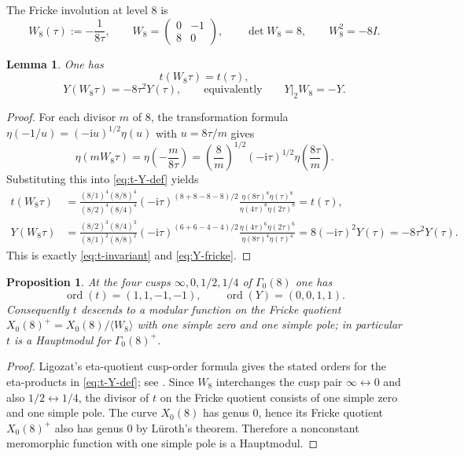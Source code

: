 \documentclass[11pt]{amsart}
\numberwithin{equation}{section}
\theoremstyle{plain}
\newtheorem{proposition}[theorem]{Proposition}
\newtheorem{lemma}[theorem]{Lemma}
\theoremstyle{definition}
\theoremstyle{remark}
\newcommand{\ii}{\mathrm{i}}
\newcommand{\etaf}{\eta}
\DeclareMathOperator{\ord}{ord}
\begin{document}
The Fricke involution at level $8$ is
\begin{equation}\label{eq:W8-def}
W_8(\tau):=-\frac{1}{8\tau},
\qquad
W_8=\begin{pmatrix}0&-1\\ 8&0\end{pmatrix},
\qquad
\det W_8=8,
\qquad
W_8^2=-8I.
\end{equation}

\begin{lemma}\label{lem:t-Y-transform}
One has
\begin{equation}\label{eq:t-invariant}
t(W_8\tau)=t(\tau),
\end{equation}
\begin{equation}\label{eq:Y-fricke}
Y(W_8\tau)=-8\tau^2Y(\tau),
\qquad\text{equivalently}\qquad
Y|_2W_8=-Y.
\end{equation}
\end{lemma}

\begin{proof}
For each divisor $m$ of $8$, the transformation formula $\eta(-1/u)=(-\ii u)^{1/2}\eta(u)$ with $u=8\tau/m$ gives
\[
\etaf(mW_8\tau)=\etaf\!\left(-\frac{m}{8\tau}\right)=\left(\frac{8}{m}\right)^{1/2}(-\ii\tau)^{1/2}\etaf\!\left(\frac{8\tau}{m}\right).
\]
Substituting this into \eqref{eq:t-Y-def} yields
\begin{align*}
t(W_8\tau)
&=\frac{(8/1)^4(8/8)^4}{(8/2)^4(8/4)^4}
(-\ii\tau)^{(8+8-8-8)/2}
\frac{\eta(8\tau)^8\eta(\tau)^8}{\eta(4\tau)^8\eta(2\tau)^8}
=t(\tau),\\
Y(W_8\tau)
&=\frac{(8/2)^3(8/4)^3}{(8/1)^2(8/8)^2}
(-\ii\tau)^{(6+6-4-4)/2}
\frac{\eta(4\tau)^6\eta(2\tau)^6}{\eta(8\tau)^4\eta(\tau)^4}
=8(-\ii\tau)^2Y(\tau)=-8\tau^2Y(\tau).
\end{align*}
This is exactly \eqref{eq:t-invariant} and \eqref{eq:Y-fricke}.
\end{proof}

\begin{proposition}\label{prop:hauptmodul}
At the four cusps $\infty,0,1/2,1/4$ of $\Gamma_0(8)$ one has
\[
\ord(t)=(1,1,-1,-1),
\qquad
\ord(Y)=(0,0,1,1).
\]
Consequently $t$ descends to a modular function on the Fricke quotient $X_0(8)^+=X_0(8)/\langle W_8\rangle$ with one simple zero and one simple pole; in particular $t$ is a Hauptmodul for $\Gamma_0(8)^+$.
\end{proposition}

\begin{proof}
Ligozat's eta-quotient cusp-order formula gives the stated orders for the eta-products in \eqref{eq:t-Y-def}; see \cite{Ligozat}. Since $W_8$ interchanges the cusp pair $\infty\leftrightarrow 0$ and also $1/2\leftrightarrow 1/4$, the divisor of $t$ on the Fricke quotient consists of one simple zero and one simple pole. The curve $X_0(8)$ has genus $0$, hence its Fricke quotient $X_0(8)^+$ also has genus $0$ by Lüroth's theorem. Therefore a nonconstant meromorphic function with one simple pole is a Hauptmodul.
\end{proof}
\end{document}

